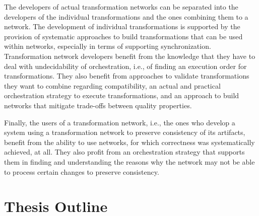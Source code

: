 The developers of actual transformation networks can be separated into the developers of the individual transformations and the ones combining them to a network.
The development of individual transformations is supported by the provision of systematic approaches to build transformations that can be used within networks, especially in terms of supporting synchronization.
Transformation network developers benefit from the knowledge that they have to deal with undecidability of orchestration, i.e., of finding an execution order for transformations.
They also benefit from approaches to validate transformations they want to combine regarding compatibility, an actual and practical orchestration strategy to execute transformations, and an approach to build networks that mitigate trade-offs between quality properties.

Finally, the users of a transformation network, i.e., the ones who develop a system using a transformation network to preserve consistency of its artifacts, benefit from the ability to use networks, for which correctness was systematically achieved, at all.
They also profit from an orchestration strategy that supports them in finding and understanding the reasons why the network may not be able to process certain changes to preserve consistency.



\section{Thesis Outline}

